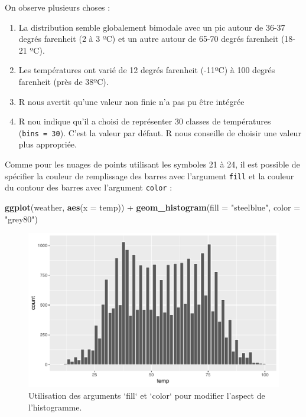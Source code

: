 \documentclass[a4paperpaper,]{article}
\newenvironment{Shaded}{\begin{snugshade}}{\end{snugshade}}
\newcommand{\DataTypeTok}[1]{\textcolor[rgb]{0.00,0.34,0.68}{#1}}
\newcommand{\KeywordTok}[1]{\textcolor[rgb]{0.12,0.11,0.11}{\textbf{#1}}}
\newcommand{\NormalTok}[1]{\textcolor[rgb]{0.12,0.11,0.11}{#1}}
\newcommand{\OperatorTok}[1]{\textcolor[rgb]{0.12,0.11,0.11}{#1}}
\newcommand{\StringTok}[1]{\textcolor[rgb]{0.75,0.01,0.01}{#1}}
\providecommand{\tightlist}{%
  \setlength{\itemsep}{0pt}\setlength{\parskip}{0pt}}
\theoremstyle{definition}
\theoremstyle{definition}
\theoremstyle{definition}
\theoremstyle{remark}
\begin{document}
On observe plusieurs choses :

\begin{enumerate}
\def\labelenumi{\arabic{enumi}.}
\tightlist
\item
  La distribution semble globalement bimodale avec un pic autour de
  36-37 degrés farenheit (2 à 3 ºC) et un autre autour de 65-70 degrés
  farenheit (18-21 ºC).
\item
  Les températures ont varié de 12 degrés farenheit (-11ºC) à 100 degrés
  farenheit (près de 38ºC).
\item
  R nous avertit qu'une valeur non finie n'a pas pu être intégrée
\item
  R nou indique qu'il a choisi de représenter 30 classes de températures
  (\texttt{bins\ =\ 30}). C'est la valeur par défaut. R nous conseille
  de choisir une valeur plus appropriée.
\end{enumerate}

Comme pour les nuages de points utilisant les symboles 21 à 24, il est
possible de spécifier la couleur de remplissage des barres avec
l'argument \texttt{fill} et la couleur du contour des barres avec
l'argument \texttt{color} :

\begin{Shaded}
\begin{Highlighting}[]
\KeywordTok{ggplot}\NormalTok{(weather, }\KeywordTok{aes}\NormalTok{(}\DataTypeTok{x =}\NormalTok{ temp)) }\OperatorTok{+}
\StringTok{  }\KeywordTok{geom_histogram}\NormalTok{(}\DataTypeTok{fill =} \StringTok{"steelblue"}\NormalTok{, }\DataTypeTok{color =} \StringTok{"grey80"}\NormalTok{)}
\end{Highlighting}
\end{Shaded}

\begin{figure}[htpb]

{\centering \includegraphics[width=0.9\linewidth]{figure/unnamed-chunk-48-1} 

}

\caption{Utilisation des arguments `fill` et `color` pour modifier l'aspect de l'histogramme.}\label{fig:unnamed-chunk-48}
\end{figure}
\end{document}
